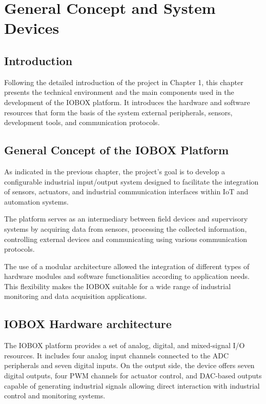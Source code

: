 \chapter{General Concept and System Devices  }

\pagestyle{fancy}
\fancyhf{}
\cfoot{\thepage}

\section{Introduction}
Following the detailed introduction of the project in Chapter 1, this chapter presents the technical environment and the main components used in the development of the IOBOX platform. It introduces the hardware and software resources that form the basis of the system external peripherals, sensors, development tools, and communication protocols.

\section{General Concept of the IOBOX Platform}
As indicated in the previous chapter, the project's goal is to develop a configurable industrial input/output system designed to facilitate the integration of sensors, actuators, and industrial communication interfaces within IoT and automation systems.

The platform serves as an intermediary between field devices and supervisory systems by acquiring data from sensors, processing the collected information, controlling external devices and communicating using various communication protocols.

The use of a modular architecture allowed the integration of different types of hardware modules and software functionalities according to application needs. This flexibility makes the IOBOX suitable for a wide range of industrial monitoring and data acquisition applications.

\section{IOBOX Hardware architecture}
The IOBOX platform provides a set of analog, digital, and mixed-signal I/O resources. It includes four analog input channels connected to the ADC peripherals and seven digital inputs. On the output side, the device offers seven digital outputs, four PWM channels for actuator control, and DAC-based outputs capable of generating industrial signals allowing direct interaction with industrial control and monitoring systems.

